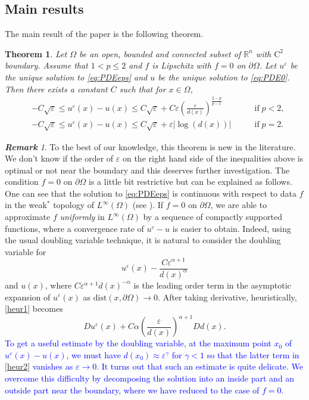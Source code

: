 \documentclass[12pt,reqno]{amsart}
\numberwithin{figure}{section}
\theoremstyle{plain}
\newtheorem{thm}{Theorem}[section]
\theoremstyle{remark}
\newtheorem{rem}{\bf{Remark}}
\numberwithin{equation}{section}
\newcommand{\R}{\mathbb{R}}
\begin{document}
\subsection{Main results} The main result of the paper is the following theorem.


\begin{thm}\label{main_thm1} Let $\Omega$ be an open, bounded and connected subset of $\R^n$ with $\mathrm{C}^2$ boundary. Assume that $1 < p\leq 2$ and $f$ is Lipschitz with $f = 0$ on $\partial\Omega$. Let $u^\varepsilon$ be the unique solution to \eqref{eq:PDEeps} and $u$ be the unique solution to \eqref{eq:PDE0}. Then there exists a constant $C$ such that for $x\in \Omega$,
\begin{align*}
    &-C\sqrt{\varepsilon}\leq  u^\varepsilon(x) - u(x)\leq C\sqrt{\varepsilon} + C\varepsilon \left(\frac{\varepsilon}{d(x)}\right)^{\frac{2-p}{p-1}} &\qquad\text{if}\; p < 2,\\
    &-C\sqrt{\varepsilon}\leq  u^\varepsilon(x) - u(x)\leq C\sqrt{\varepsilon} + \varepsilon|\log(d(x))| &\qquad\text{if}\; p = 2.
\end{align*}
\end{thm}

\begin{rem} To the best of our knowledge, this theorem is new in the literature. We don't know if the order of $\varepsilon$ on the right hand side of the inequalities above is optimal or not near the boundary and this deserves further investigation. The condition $f = 0$ on $\partial\Omega$ is a little bit restrictive but can be explained as follows. One can see that the solution to \eqref{eq:PDEeps} is continuous with respect to data $f$ in the weak$^*$ topology of $L^\infty(\Omega)$ (see \cite{Lasry1989}). If $f = 0$ on $\partial\Omega$, we are able to approximate $f$ \emph{uniformly} in $L^\infty(\Omega)$ by a sequence of compactly supported functions, where a convergence rate of $u^\varepsilon-u$ is easier to obtain. Indeed, using the usual doubling variable technique, it is natural to consider the doubling variable for
\begin{equation}\label{heur1}
    u^\varepsilon(x) - \frac{C\varepsilon^{\alpha+1}}{d(x)^{\alpha}}
\end{equation}
and $u(x)$, where $C\varepsilon^{\alpha+1}d(x)^{-\alpha}$ is the leading order term in the asymptotic expansion of $u^\varepsilon(x)$ as $\mathrm{dist}(x,\partial\Omega)\to 0$. After taking derivative, heuristically, \eqref{heur1} becomes
\begin{equation}\label{heur2}
    Du^\varepsilon(x) + C\alpha \left(\frac{\varepsilon}{d(x)}\right)^{\alpha+1}Dd(x).
\end{equation}
\textcolor{blue}{
To get a useful estimate by the doubling variable, at the maximum point $x_0$ of $u^\varepsilon(x) - u(x)$, we must have $d(x_0)\approx \varepsilon^{\gamma}$ for $\gamma<1$ so that the latter term in \eqref{heur2} vanishes as $\varepsilon\to 0$. It turns out that such an estimate is quite delicate. We overcome this difficulty by decomposing the solution into an inside part and an outside part near the boundary, where we have reduced to the case of $f=0$.}
\end{rem}
\end{document}
